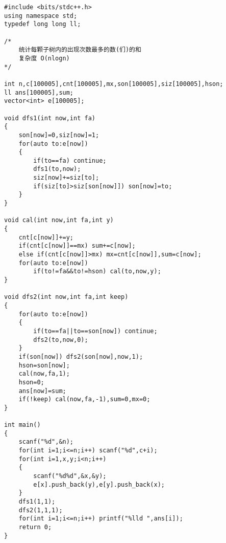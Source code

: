 \begin{lstlisting}
#include <bits/stdc++.h>
using namespace std;
typedef long long ll;

/*
    统计每颗子树内的出现次数最多的数(们)的和
    复杂度 O(nlogn)
*/

int n,c[100005],cnt[100005],mx,son[100005],siz[100005],hson;
ll ans[100005],sum;
vector<int> e[100005];

void dfs1(int now,int fa)
{
    son[now]=0,siz[now]=1;
    for(auto to:e[now])
    {
        if(to==fa) continue;
        dfs1(to,now);
        siz[now]+=siz[to];
        if(siz[to]>siz[son[now]]) son[now]=to;
    }
}

void cal(int now,int fa,int y)
{
    cnt[c[now]]+=y;
    if(cnt[c[now]]==mx) sum+=c[now];
    else if(cnt[c[now]]>mx) mx=cnt[c[now]],sum=c[now];
    for(auto to:e[now])
        if(to!=fa&&to!=hson) cal(to,now,y);
}

void dfs2(int now,int fa,int keep)
{
    for(auto to:e[now])
    {
        if(to==fa||to==son[now]) continue;
        dfs2(to,now,0);
    }
    if(son[now]) dfs2(son[now],now,1);
    hson=son[now];
    cal(now,fa,1);
    hson=0;
    ans[now]=sum;
    if(!keep) cal(now,fa,-1),sum=0,mx=0;
}

int main()
{
    scanf("%d",&n);
    for(int i=1;i<=n;i++) scanf("%d",c+i);
    for(int i=1,x,y;i<n;i++)
    {
        scanf("%d%d",&x,&y);
        e[x].push_back(y),e[y].push_back(x);
    }
    dfs1(1,1);
    dfs2(1,1,1);
    for(int i=1;i<=n;i++) printf("%lld ",ans[i]);
    return 0;
}
\end{lstlisting}